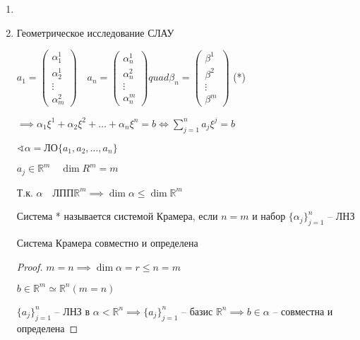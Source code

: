 \documentclass{book}
\newcommand\R{\ensuremath{\mathbb{R}}}
\theoremstyle{definition}
\begin{document}
\begin{enumerate}
    \item 
    \item Геометрическое исследование СЛАУ

        $a_1 = \begin{pmatrix} \alpha_1^1 \\ \alpha_2^1 \\ \vdots \\ \alpha_m^2 \end{pmatrix} \quad a_n = \begin{pmatrix} \alpha_n^1 \\ \alpha_n^2 \\ \vdots \\ \alpha_n^m \end{pmatrix} quad \beta_n = \begin{pmatrix} \beta^1\\ \beta^2 \\ \vdots \\ \beta^m \end{pmatrix} $ (*)

        $\implies \alpha_1\xi^1 + \alpha_2\xi^2 + \ldots + \alpha_n\xi^n = b \iff \sum_{j=1}^{n} a_j\xi^j = b$ 

        $\sphericalangle \mathscr{\alpha} = \text{ЛО}\{a_1, a_2, \ldots, a_n\}$

        $a_j\in \R^m\quad \dim R^m = m$

        Т.к. $\mathscr{\alpha}\quad \text{ЛПП} \R^m \implies \dim \mathscr{\alpha}\leqslant \dim \R^m$

        \begin{definition}
            Система * называется системой Крамера, если $n=m$ и набор  $\{\alpha_j\}_{j=1}^n$ -- ЛНЗ
        \end{definition}

        \begin{theorem}
            Система Крамера совместно и определена
        \end{theorem}
        \begin{proof}
            $m=n \implies \dim \mathscr{\alpha} = r\leqslant n=m$

            $b\in \R^m \simeq \R^n\left( m=n \right) $ 

            $\{a_j\}_{j=1}^n$ -- ЛНЗ в  $\mathscr{\alpha}<\R^n\implies \{a_j\}_{j=1}^n$ -- базис $\R^n\implies b\in\mathscr{\alpha} $ -- совместна и определена
        \end{proof}


\end{enumerate}
\end{document}
